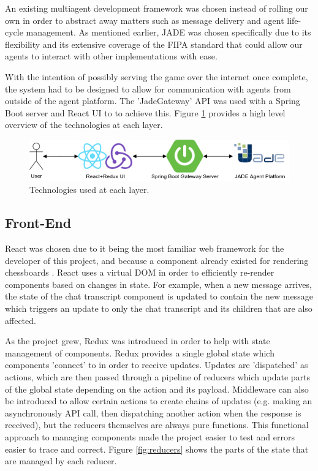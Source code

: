 \documentclass[conference]{IEEEtran}
\begin{document}
An existing multiagent development framework was chosen instead of rolling our own in order to abstract away matters such as message delivery and agent life-cycle management. As mentioned earlier, JADE was chosen specifically due to its flexibility and its extensive coverage of the FIPA standard that could allow our agents to interact with other implementations with ease. 

With the intention of possibly serving the game over the internet once complete, the system had to be designed to allow for communication with agents from outside of the agent platform. The 'JadeGateway' API was used with a Spring Boot server and React UI to to achieve this. Figure \ref{fig:highlevelarchitecture} provides a high level overview of the technologies at each layer.

\begin{figure}[h]
	\centering
	\includegraphics[width=\linewidth]{images/highlevelarchitecture}
	\caption{Technologies used at each layer.}
	\label{fig:highlevelarchitecture}
\end{figure}

\subsection{Front-End}

React \cite{reactjs} was chosen due to it being the most familiar web framework for the developer of this project, and because a component already existed for rendering chessboards \cite{chessboardjsx}. React uses a virtual DOM in order to efficiently re-render components based on changes in state. For example, when a new message arrives, the state of the chat transcript component is updated to contain the new message which triggers an update to only the chat transcript and its children that are also affected. 

As the project grew, Redux \cite{redux} was introduced in order to help with state management of components. Redux provides a single global state which components 'connect' to in order to receive updates. Updates are 'dispatched' as actions, which are then passed through a pipeline of reducers which update parts of the global state depending on the action and its payload. Middleware can also be introduced to allow certain actions to create chains of updates (e.g. making an asynchronously API call, then dispatching another action when the response is received), but the reducers themselves are always pure functions. This functional approach to managing components made the project easier to test and errors easier to trace and correct. Figure \ref{fig:reducers} shows the parts of the state that are managed by each reducer.
\end{document}
